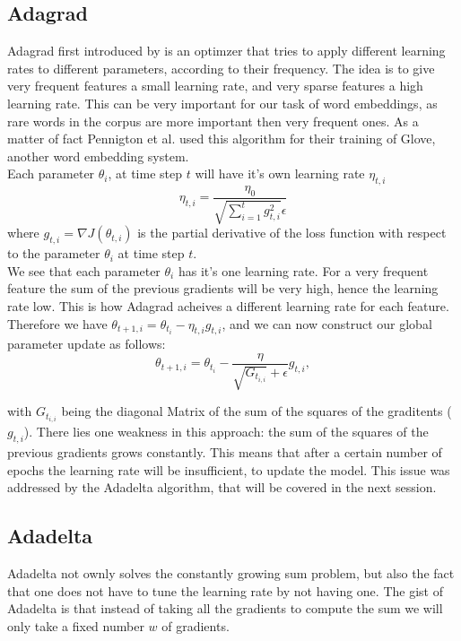 \subsection{Adagrad}
Adagrad first introduced by \cite{adagrad} is an optimzer that tries to apply different learning rates to different parameters, according to their frequency. The idea is to give very frequent features a small learning rate, and very sparse features a high learning rate. This can be very important for our task of word embeddings, as rare words in the corpus are more important then very frequent ones. As a matter of fact Pennigton et al. used this algorithm for their training of Glove, another word embedding system. \\
Each parameter $\theta_i$, at time step $t$ will have it's own learning rate $\eta_{t,i}$
 \begin{equation}
\eta_{t,i} = \frac{\eta_0}{\sqrt{\sum^{t}_{i=1} g^{2}_{t,i}} \epsilon}
\end{equation}
where
$g_{t,i} = \nabla J(\theta_{t,i})$  is the partial derivative of the loss function with respect to the parameter $\theta_i$ at time step $t$. \\ We see that each parameter $\theta_{i}$ has it's one learning rate. For a very frequent feature the sum of the previous gradients will be very high, hence the learning rate low. This is how Adagrad acheives a different learning rate for each feature. 
Therefore we have $ \theta_{t+1,i} = \theta_{t_i} - \eta_{t,i} g_{t,i} $, and we can now construct our global parameter update as follows: 
\begin{equation}
\theta_{t+1,i} = \theta_{t_i}- \frac{\eta}{\sqrt{G_{t_{i,i}}} + \epsilon} g_{t,i}, 
\end{equation} 

with  $G_{t_{i,i}}$ being the diagonal Matrix of the sum of the squares of the graditents ($g_{t,i} $). 
There lies one weakness in this approach: the sum of the squares of the previous gradients grows constantly. This means that after a certain number of epochs the learning rate will be insufficient, to update the model. This issue was addressed by the Adadelta algorithm, that will be covered in the next session. 

\subsection{Adadelta}
Adadelta not ownly solves the constantly growing sum problem, but also the fact that one does not have to tune the learning rate by not having one. The gist of Adadelta is that instead of taking all the gradients to compute the sum we will only take a fixed number $w$ of gradients.  
